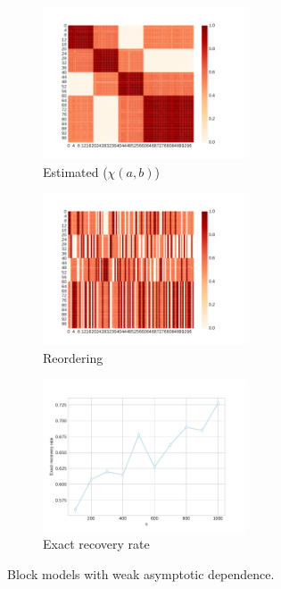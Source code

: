 \documentclass[11pt]{article}
\begin{document}
	\begin{figure}[!htp]
    \label{fig:chiab}
                \begin{subfigure}{.33\textwidth}
                  \centering
                  \includegraphics[width=.9\linewidth,height=4.5cm]{figure/chiab.pdf}
                  \caption{Estimated ($\chi(a,b)$)}
                  \label{fig:sfig_chiab}
                \end{subfigure}%
                \begin{subfigure}{.33\textwidth}
                  \centering
                  \includegraphics[width=.9\linewidth,height=4.5cm]{figure/chiab_sampled.pdf}
                  \caption{Reordering}
                  \label{fig:sfig_chiab_sampled}
                \end{subfigure}
                \begin{subfigure}{.33\textwidth}
                  \centering
                  \includegraphics[width=.9\linewidth,height=4.5cm]{figure/exact_recov_rate_model_4.pdf}
                  \caption{Exact recovery rate}
                  \label{fig:sfig_results_model_4}
                \end{subfigure}
    	\caption{Block models with weak asymptotic dependence.}
	\end{figure}
	
\end{document}

